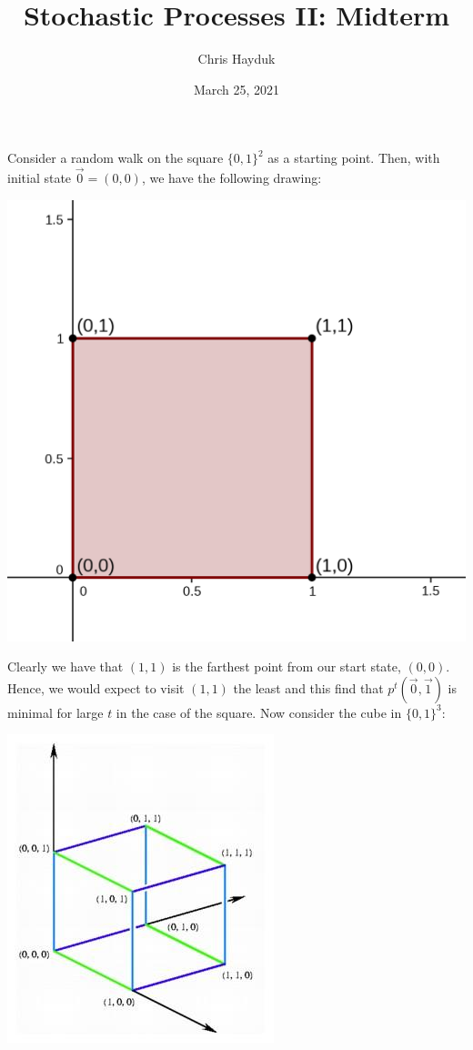 \documentclass[12pt]{article}
\newenvironment{problem}[2][Problem]{\begin{trivlist}
\item[\hskip \labelsep {\bfseries #1}\hskip \labelsep {\bfseries #2.}]}{\end{trivlist}}
\begin{document}
\title{Stochastic Processes II: Midterm}

\author{Chris Hayduk}
\date{March 25, 2021}

\maketitle

\begin{problem}{I}
\end{problem}

\begin{problem}{II}
\end{problem}

Consider a random walk on the square $\{0, 1\}^2$ as a starting point. Then, with initial state $\vec{0} = (0, 0)$, we have the following drawing:

\includegraphics[scale=0.15]{unit_square}

Clearly we have that $(1, 1)$ is the farthest point from our start state, $(0, 0)$. Hence, we would expect to visit $(1, 1)$ the least and this find that $p^t(\vec{0}, \vec{1})$ is minimal for large $t$ in the case of the square. Now consider the cube in $\{0, 1\}^3$:

\includegraphics[scale=1]{unit_cube}
\end{document}
